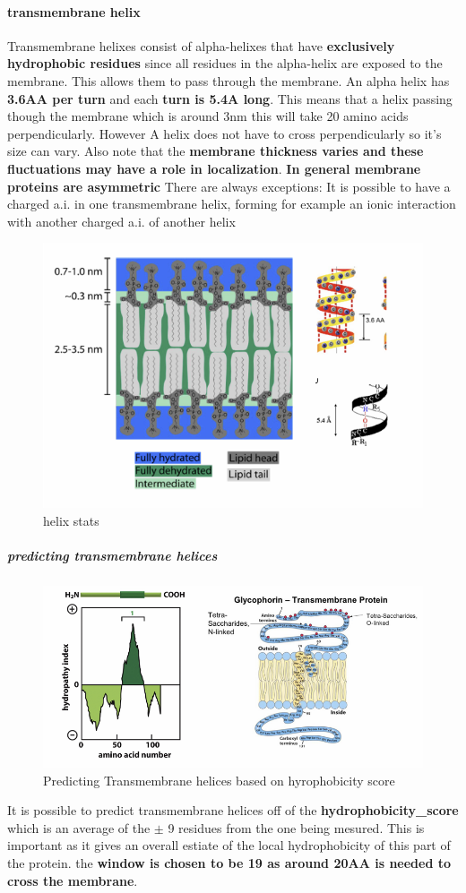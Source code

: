 \documentclass[../main.tex]{subfiles}
\begin{document}
\paragraph{transmembrane helix}
Transmembrane helixes consist of alpha-helixes that have \textbf{exclusively hydrophobic residues} since all residues in the alpha-helix are exposed to the membrane. This allows them to pass through the membrane. An alpha helix has \textbf{3.6AA per turn} and each \textbf{turn is 5.4A long}. This means that a helix passing though the membrane which is around 3nm this will take 20 amino acids perpendicularly. However A helix does not have to cross perpendicularly so it's size can vary. Also note that  the \textbf{membrane thickness varies and these fluctuations may have a role in localization}.\textbf{ In general  membrane proteins are asymmetric}
 There are always exceptions:
 It is possible to have a charged a.i. in one transmembrane 
helix, forming for example an ionic interaction with another 
charged a.i. of another helix
\begin{figure}[H]
    \centering
    \includegraphics[width=0.5\linewidth]{helix_overview.png}
    \caption{helix stats}
    \label{fig:enter-label}
\end{figure}

\subparagraph{predicting transmembrane helices}
\begin{figure}[H]
    \centering
    \includegraphics[width=0.5\linewidth]{transmembrane_helix.png}
    \caption{Predicting Transmembrane helices based on hyrophobicity score}
    \label{fig:enter-label}
\end{figure}
It is possible to predict transmembrane helices off of the \textbf{\gls{hydrophobicity_score}} which is an average of the $\pm$ 9 residues from the one being mesured. This is important as it gives an overall estiate of the local hydrophobicity of this part of the protein. the \textbf{window is chosen to be 19 as around 20AA is needed to cross the membrane}.
\end{document}
